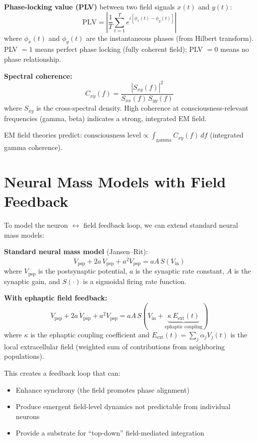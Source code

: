 \documentclass[11pt,a4paper]{report}
\begin{document}
\begin{mathbox}
\vspace{-6pt}
\textbf{Phase-locking value (PLV)} between two field signals $x(t)$ and $y(t)$:
\[
  \text{PLV} = \left|\frac{1}{T}\sum_{t=1}^{T} e^{i[\phi_x(t) - \phi_y(t)]}\right|
\]
where $\phi_x(t)$ and $\phi_y(t)$ are the instantaneous phases (from Hilbert transform). PLV $= 1$ means perfect phase locking (fully coherent field); PLV $= 0$ means no phase relationship.

\textbf{Spectral coherence:}
\[
  C_{xy}(f) = \frac{|S_{xy}(f)|^2}{S_{xx}(f)\, S_{yy}(f)}
\]
where $S_{xy}$ is the cross-spectral density. High coherence at consciousness-relevant frequencies (gamma, beta) indicates a strong, integrated EM field.

EM field theories predict: $\text{consciousness level} \propto \int_{\text{gamma}} C_{xy}(f)\, df$ (integrated gamma coherence).
\vspace{-4pt}
\end{mathbox}

\section{Neural Mass Models with Field Feedback}

To model the neuron $\leftrightarrow$ field feedback loop, we can extend standard neural mass models:

\begin{mathbox}
\vspace{-6pt}
\textbf{Standard neural mass model} (Jansen--Rit):
\[
  \ddot{V}_{\text{psp}} + 2a\,\dot{V}_{\text{psp}} + a^2 V_{\text{psp}} = a A\, S(V_{\text{in}})
\]
where $V_{\text{psp}}$ is the postsynaptic potential, $a$ is the synaptic rate constant, $A$ is the synaptic gain, and $S(\cdot)$ is a sigmoidal firing rate function.

\textbf{With ephaptic field feedback:}
\[
  \ddot{V}_{\text{psp}} + 2a\,\dot{V}_{\text{psp}} + a^2 V_{\text{psp}} = a A\, S\!\left(V_{\text{in}} + \underbrace{\kappa\, E_{\text{ext}}(t)}_{\text{ephaptic coupling}}\right)
\]
where $\kappa$ is the ephaptic coupling coefficient and $E_{\text{ext}}(t) = \sum_j \alpha_j V_j(t)$ is the local extracellular field (weighted sum of contributions from neighboring populations).

This creates a feedback loop that can:
\begin{itemize}[leftmargin=1.5em]
  \item Enhance synchrony (the field promotes phase alignment)
  \item Produce emergent field-level dynamics not predictable from individual neurons
  \item Provide a substrate for ``top-down'' field-mediated integration
\end{itemize}
\vspace{-4pt}
\end{mathbox}
\end{document}
